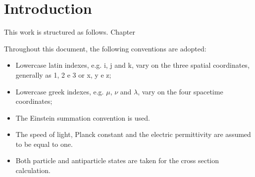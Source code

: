 \chapter*{Introduction}

This work is structured as follows. Chapter 

Throughout this document, the following conventions are adopted:
\begin{itemize}
    \item Lowercase latin indexes, e.g. i, j and k, vary on the three spatial coordinates, generally as 1, 2 e 3 or x, y e z;
    \item Lowercase greek indexes, e.g. $\mu$, $\nu$ and $\lambda$, vary on the four spacetime coordinates;
    \item The Einstein summation convention is used.
    \item The speed of light, Planck constant and the electric permittivity are assumed to be equal to one.
    \item Both particle and antiparticle states are taken for the cross section calculation.
\end{itemize}